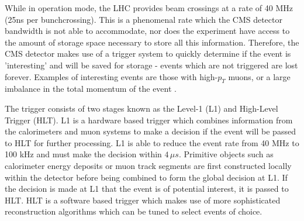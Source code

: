 While in operation mode, the LHC provides beam crossings at a rate of 40 MHz (25ns per bunchcrossing). This is a phenomenal rate which the CMS detector bandwidth is not able to accommodate, nor does the experiment have access to the amount of storage space necessary to store all this information. Therefore, the CMS detector makes use of a trigger system to quickly determine if the event is 'interesting' and will be saved for storage - events which are not triggered are lost forever. Examples of interesting events are those with high-$p_{T}$ muons, or a large imbalance in the total momentum of the event \cite{CMS-TRG-12-001}.

The trigger consists of two stages known as the Level-1 (L1) and High-Level Trigger (HLT). L1 is a hardware based trigger which combines information from the calorimeters and muon systems to make a decision if the event will be passed to HLT for further processing. L1 is able to reduce the event rate from 40 MHz to 100 kHz and must make the decision within $4\,\mu s$. Primitive objects such as calorimeter energy deposits or muon track segments are first constructed locally within the detector before being combined to form the global decision at L1. If the decision is made at L1 that the event is of potential interest, it is passed to HLT. HLT is a software based trigger which makes use of more sophisticated reconstruction algorithms which can be tuned to select events of choice.

